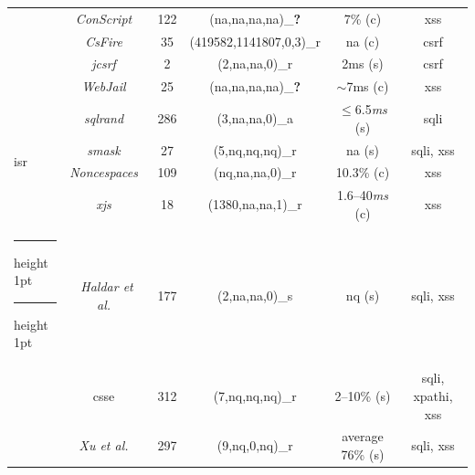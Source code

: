\documentclass[conference]{IEEEtran}
\makeatletter
\newcommand{\tick}{\ding{52}}
\newcommand{\xmark}{\ding{56}}
\newcommand{\thickhline}{%
    \noalign {\ifnum 0=`}\fi \hrule height 1pt
    \futurelet \reserved@a \@xhline
}
\makeatother
\begin{document}
\begin{table}
\begin{threeparttable}
\begin{small}
{\begin{tabular}{l|c|c|cc|c}
  &   {\it ConScript}~\cite{ML10} & 122 & ({\sc na},{\sc na},{\sc na},{\sc na})\_{\bf ?} & 7\% ({\sc c}) & {\sc xss} \\
  &   {\it CsFire}~\cite{DDHPJ10} & 35 & (419582,1141807,0,3)\_r\tnote{5} & {\sc na} ({\sc c}) & {\sc csrf} \\
  &   {\it j{\sc csrf}}~\cite{PS11} & 2 & (2,{\sc na},{\sc na},0)\_r & 2ms ({\sc s}) & {\sc csrf} \\
  &   {\it WebJail}~\cite{VDDPJ11} & 25 & ({\sc na},{\sc na},{\sc na},{\sc na})\_{\bf ?} & $\sim$7ms ({\sc c}) & {\sc xss} \\
  \hline
  \multirow{4}{*}{{\sc isr}}
  &   {\it {\sc sql}rand}~\cite{BK04} & 286 & (3,{\sc na},{\sc na},0)\_a & $\le$6.5{\it ms} ({\sc s}) & {\sc sql}i \\
  &   {\it {\sc sm}ask}~\cite{JB07} & 27 & (5,{\sc nq},{\sc nq},{\sc nq})\_r  & {\sc na} ({\sc s}) & {\sc sql}i, {\sc xss} \\
  &   {\it Noncespaces}~\cite{GC09} & 109 & ({\sc nq},{\sc na},{\sc na},0)\_r &  10.3\% ({\sc c}) & {\sc xss} \\ 
  &   {\it x{\sc js}}~\cite{APKLM10} & 18 & (1380,{\sc na},{\sc na},1)\_r & 1.6--40{\it ms} ({\sc c}) & {\sc xss} \\
  \thickhline
  \thickhline
  \multirow{7}{*}{Taint Tracking}
  &   {\it Haldar et al.}~\cite{HCF05} & 177 & (2,{\sc na},{\sc na},0)\_s & {\sc nq} ({\sc s}) & {\sc sql}i, {\sc xss} \\ 
  &   {\sc csse}~\cite{PB05} & 312 & (7,{\sc nq},{\sc nq},{\sc nq})\_r & 2--10\% ({\sc s}) & {\sc sql}i, {\sc xp}athi, {\sc xss} \\
  &   {\it Xu et al.}~\cite{XBS06} & 297 & (9,{\sc nq},0,{\sc nq})\_r & average 76\% ({\sc s}) & {\sc sql}i, {\sc xss} \\ 

\end{tabular}}
\end{small}
\end{threeparttable}
\end{table}
\end{document}
